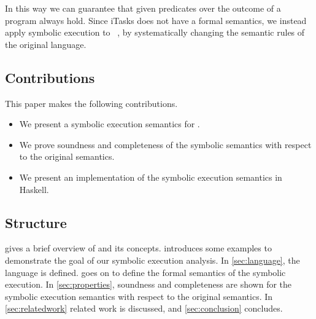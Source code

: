 In this way we can guarantee that given predicates over the outcome of a \TOP program always hold.
Since iTasks does not have a formal semantics, we instead apply symbolic execution to \TOPHAT~\cite{Steenvoorden2019}, by systematically changing the semantic rules of the original language.



\subsection{Contributions}

This paper makes the following contributions.

\begin{itemize}
  \item We present a symbolic execution semantics for \TOPHAT.
  \item We prove soundness and completeness of the symbolic semantics with respect to the original \TOPHAT semantics.
  \item We present an implementation of the symbolic execution semantics in Haskell.
\end{itemize}



\subsection{Structure}

 gives a brief overview of \TOPHAT and its concepts.
 introduces some examples to demonstrate the goal of our symbolic execution analysis.
In \cref{sec:language}, the \TOPHAT language is defined.
 goes on to define the formal semantics of the symbolic execution.
In \cref{sec:properties}, soundness and completeness are shown for the symbolic execution semantics with respect to the original \TOPHAT semantics.
In \cref{sec:relatedwork} related work is discussed, and \cref{sec:conclusion} concludes.
